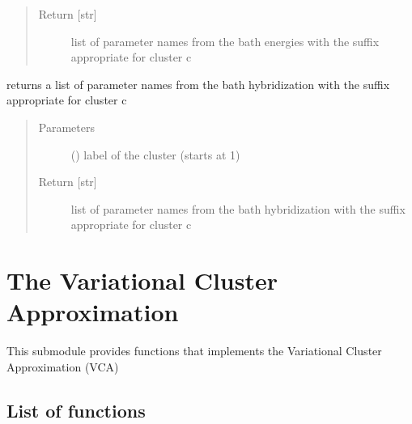 \documentclass[letterpaper,10pt,english]{sphinxmanual}
\begin{document}
\begin{fulllineitems}
\begin{fulllineitems}
\begin{quote}
\begin{description}
\item[{Return {[}str{]}}] \leavevmode
\sphinxAtStartPar
list of parameter names from the bath energies with the suffix appropriate for cluster c

\end{description}\end{quote}

\end{fulllineitems}


\begin{fulllineitems}
\label{\detokenize{cdmft:pyqcm.cdmft.general_bath.varia_H}}
\sphinxAtStartPar
returns a list of parameter names from the bath hybridization with the suffix appropriate for cluster c
\begin{quote}\begin{description}
\item[{Parameters}] \leavevmode
\sphinxAtStartPar
{} () \textendash{} label of the cluster (starts at 1)

\item[{Return {[}str{]}}] \leavevmode
\sphinxAtStartPar
list of parameter names from the bath hybridization with the suffix appropriate for cluster c

\end{description}\end{quote}

\end{fulllineitems}


\end{fulllineitems}



\chapter{The Variational Cluster Approximation}
\label{\detokenize{vca:the-variational-cluster-approximation}}\label{\detokenize{vca::doc}}
\sphinxAtStartPar
This submodule provides functions that implements the Variational Cluster Approximation (VCA)


\section{List of functions}
\label{\detokenize{vca:module-pyqcm.vca}}\label{\detokenize{vca:list-of-functions}}
\end{document}

